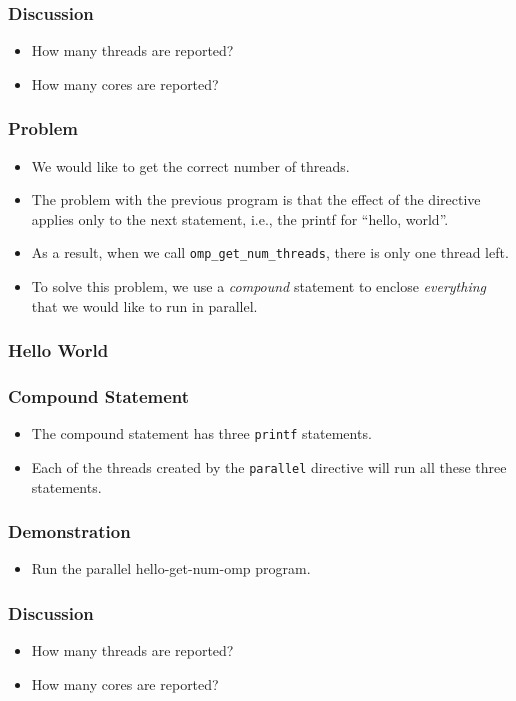 \documentclass{beamer}
\begin{document}
\begin{frame}
\frametitle{Discussion}
\begin{itemize}
\item How many threads are reported?
\item How many cores are reported?
\end{itemize}
\end{frame}

\begin{frame}
\frametitle{Problem}
\begin{itemize}
\item We would like to get the correct number of threads.
\item The problem with the previous program is that the effect of the directive applies only to the next statement, i.e., the printf for  ``hello, world''.
\item As a result, when we call {\tt omp\_get\_num\_threads}, there is
  only one thread left.
\item To solve this problem, we use a {\em compound} statement to
  enclose {\em everything} that we would like to run in parallel.
\end{itemize}
\end{frame}


\begin{frame}
\frametitle{Hello World}
\end{frame}

\begin{frame}
\frametitle{Compound Statement}
\begin{itemize}
\item The compound statement has three {\tt printf} statements.
\item Each of the threads created by the {\tt parallel} directive will
  run all these three statements.
\end{itemize}
\end{frame}

\begin{frame}
\frametitle{Demonstration}
\begin{itemize}
\item Run the parallel hello-get-num-omp program.
\end{itemize}
\end{frame}

\begin{frame}
\frametitle{Discussion}
\begin{itemize}
\item How many threads are reported?
\item How many cores are reported?
\end{itemize}
\end{frame}
\end{document}
